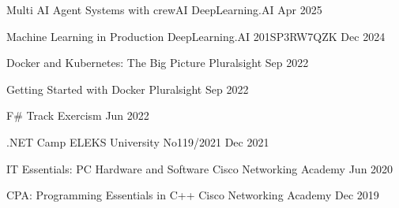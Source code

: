 \begin{cvhonors}

  \cvhonor
    {Multi AI Agent Systems with crewAI} %
    {DeepLearning.AI} %
    {} %
    {Apr 2025} %

  \cvhonor
    {Machine Learning in Production} %
    {DeepLearning.AI} %
    {201SP3RW7QZK} %
    {Dec 2024} %

  \cvhonor
    {Docker and Kubernetes: The Big Picture} %
    {Pluralsight} %
    {} %
    {Sep 2022} %

  \cvhonor
    {Getting Started with Docker} %
    {Pluralsight} %
    {} %
    {Sep 2022} %

  \cvhonor
    {F\# Track} %
    {Exercism} %
    {} %
    {Jun 2022} %

  \cvhonor
    {.NET Camp} %
    {ELEKS University} %
    {No119/2021} %
    {Dec 2021} %

  \cvhonor
    {IT Essentials: PC Hardware and Software} %
    {Cisco Networking Academy} %
    {} %
    {Jun 2020} %

  \cvhonor
    {CPA: Programming Essentials in C++} %
    {Cisco Networking Academy} %
    {} %
    {Dec 2019} %

\end{cvhonors}
